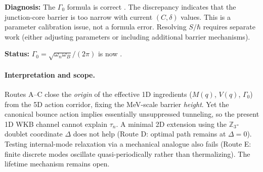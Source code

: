 \textbf{Diagnosis:} The $\Gamma_0$ formula is correct \tagDc{}. The discrepancy indicates
that the junction-core barrier is too narrow with current $(C, \delta)$ values. This is
a parameter calibration issue, not a formula error. Resolving $S/\hbar$ requires separate
work (either adjusting parameters or including additional barrier mechanisms).

\textbf{Status:} $\Gamma_0 = \sqrt{\omega_n \omega_B}/(2\pi)$ is now \tagDc{}.

\paragraph{Interpretation and scope.}
Routes A--C close the \emph{origin} of the effective 1D ingredients ($M(q)$, $V(q)$, $\Gamma_0$) from the 5D action corridor, fixing the MeV-scale barrier \emph{height}.
Yet the canonical bounce action implies essentially unsuppressed tunneling, so the present 1D WKB channel cannot explain $\tau_n$.
A minimal 2D extension using the $\mathbb{Z}_3$-doublet coordinate $\Delta$ does not help (Route D: optimal path remains at $\Delta=0$).
Testing internal-mode relaxation via a mechanical analogue also fails (Route E: finite discrete modes oscillate quasi-periodically rather than thermalizing).
The lifetime mechanism remains open.

